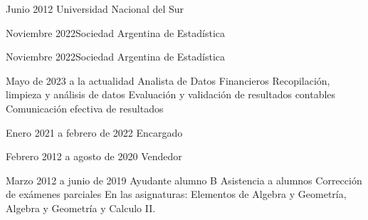 \documentclass{CV_template}
\begin{document}
\begin{paracol}{2}
\begin{rightcolumn}
            {Junio 2012}{%
            Universidad Nacional del Sur}



            {Noviembre 2022}{Sociedad Argentina de Estadística}

            {Noviembre 2022}{Sociedad Argentina de Estadística}

% 
% 



    {Mayo de 2023 a la actualidad}
    {Analista de Datos Financieros}
    {Recopilación, limpieza y análisis de datos}
    {Evaluación y validación de resultados contables}
    {Comunicación efectiva de resultados}
    {}

    {Enero 2021 a febrero de 2022}
    {Encargado}
    {}{}{}{}{}
    
    {Febrero 2012 a agosto de 2020}
    {Vendedor}
    {}{}{}{}{}{}
    
    {Marzo 2012 a junio de 2019}
    {Ayudante alumno B}
    {Asistencia a alumnos}
    {Corrección de exámenes parciales}
    {En las asignaturas: 
    Elementos de Algebra y Geometría,
     Algebra y Geometría y Calculo II.}
    {}


\end{rightcolumn}

\end{paracol}
\end{document}
